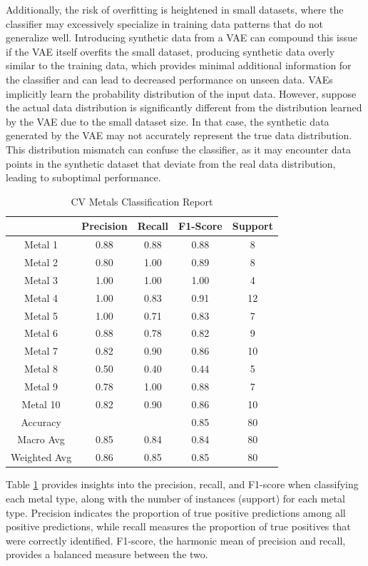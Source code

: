 Additionally, the risk of overfitting is heightened in small datasets, where the classifier may excessively specialize in training data patterns that do not generalize well. Introducing synthetic data from a VAE can compound this issue if the VAE itself overfits the small dataset, producing synthetic data overly similar to the training data, which provides minimal additional information for the classifier and can lead to decreased performance on unseen data. VAEs implicitly learn the probability distribution of the input data. However, suppose the actual data distribution is significantly different from the distribution learned by the VAE due to the small dataset size. In that case, the synthetic data generated by the VAE may not accurately represent the true data distribution. This distribution mismatch can confuse the classifier, as it may encounter data points in the synthetic dataset that deviate from the real data distribution, leading to suboptimal performance.
\begin{table}[!h]
\begin{center}
\begin{tabular}{c|c|c|c|c}
 & Precision & Recall & F1-Score & Support\\
\hline
Metal 1 & 0.88 & 0.88 & 0.88 & 8\\
Metal 2 & 0.80 & 1.00 & 0.89 & 8\\
Metal 3 & 1.00 & 1.00 & 1.00 & 4\\
Metal 4 & 1.00 & 0.83 & 0.91 & 12\\
Metal 5 & 1.00 & 0.71 & 0.83 & 7\\
Metal 6 & 0.88 & 0.78 & 0.82 & 9\\
Metal 7 & 0.82 & 0.90 & 0.86 & 10\\
Metal 8 & 0.50 & 0.40 & 0.44 & 5\\
Metal 9 & 0.78 & 1.00 & 0.88 & 7\\
Metal 10 & 0.82 & 0.90 & 0.86 & 10\\
\hline
Accuracy & & & 0.85 & 80\\
Macro Avg & 0.85 & 0.84 & 0.84 & 80\\
Weighted Avg & 0.86 & 0.85 & 0.85 & 80
\end{tabular}
\caption{CV Metals Classification Report}
\label{cv_metal_report}
\end{center}
\end{table}
Table \ref{cv_metal_report} provides insights into the precision, recall, and F1-score when classifying each metal type, along with the number of instances (support) for each metal type. Precision indicates the proportion of true positive predictions among all positive predictions, while recall measures the proportion of true positives that were correctly identified. F1-score, the harmonic mean of precision and recall, provides a balanced measure between the two.

